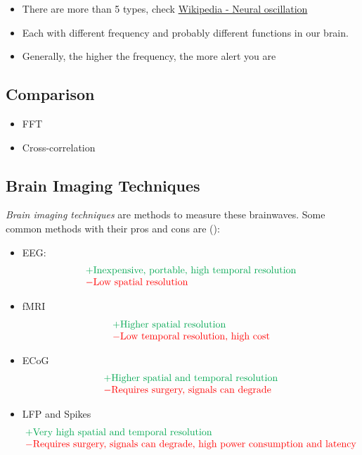 \note
\begin{itemize}
	\item There are more than 5 types, check \href{https://en.wikipedia.org/wiki/Neural_oscillation}{Wikipedia - Neural oscillation}
	\item Each with different frequency and probably different functions in our brain.
	\item Generally, the higher the frequency, the more alert you are
\end{itemize}

\subsection{Comparison}
\begin{itemize}
	\item \ac{FFT}
	\item Cross-correlation
\end{itemize}

\subsection{Brain Imaging Techniques}
\textit{Brain imaging techniques} are methods to measure these brainwaves. Some common methods with their pros and cons are ():
\begin{itemize}
	\item \ac{EEG}:
	\[\begin{matrix*}[l]
		\color{Green} + \text{Inexpensive, portable, high temporal resolution}\\
		\color{red} - \text{Low spatial resolution}
	\end{matrix*}\]
	\item \ac{fMRI}
	\[\begin{matrix*}[l]
		\color{Green} + \text{Higher spatial resolution}\\
		\color{red} - \text{Low temporal resolution, high cost}
	\end{matrix*}\]
	\item \ac{ECoG}
	\[\begin{matrix*}[l]
		\color{Green} + \text{Higher spatial and temporal resolution}\\
		\color{red} - \text{Requires surgery, signals can degrade}
	\end{matrix*}\]
	\item \ac{LFP} and Spikes
	\[\begin{matrix*}[l]
		\color{Green} + \text{Very high spatial and temporal resolution}\\
		\color{red} - \text{Requires surgery, signals can degrade, high power consumption and latency}
	\end{matrix*}\]
\end{itemize}

